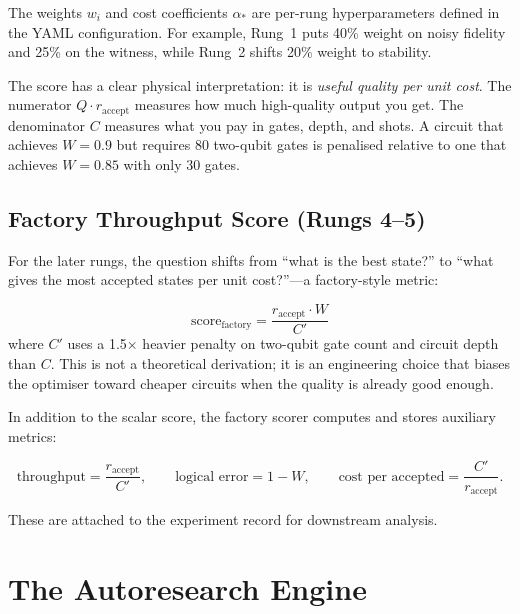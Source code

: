 \documentclass[11pt,a4paper]{article}
\begin{document}
The weights $w_i$ and cost coefficients $\alpha_*$ are per-rung
hyperparameters defined in the YAML configuration. For example, Rung~1 puts
40\% weight on noisy fidelity and 25\% on the witness, while Rung~2 shifts
20\% weight to stability.

\begin{intuition}
The score has a clear physical interpretation: it is \emph{useful quality per
unit cost}. The numerator $Q \cdot r_{\text{accept}}$ measures how much
high-quality output you get. The denominator $C$ measures what you pay in
gates, depth, and shots. A circuit that achieves $W = 0.9$ but requires 80
two-qubit gates is penalised relative to one that achieves $W = 0.85$ with
only 30 gates.
\end{intuition}

\subsection{Factory Throughput Score (Rungs 4--5)}
\label{sec:factory}

For the later rungs, the question shifts from ``what is the best state?'' to
``what gives the most accepted states per unit cost?''---a factory-style
metric:

\begin{equation}
  \text{score}_{\text{factory}}
    = \frac{r_{\text{accept}} \cdot W}{\;C'\;}
  \label{eq:factory}
\end{equation}
where $C'$ uses a 1.5$\times$ heavier penalty on two-qubit gate count and
circuit depth than $C$. This is not a theoretical derivation; it is an
engineering choice that biases the optimiser toward cheaper circuits when the
quality is already good enough.

In addition to the scalar score, the factory scorer computes and stores
auxiliary metrics:

\begin{equation}
  \text{throughput} = \frac{r_{\text{accept}}}{C'}, \qquad
  \text{logical error} = 1 - W, \qquad
  \text{cost per accepted} = \frac{C'}{r_{\text{accept}}}.
  \label{eq:factory_metrics}
\end{equation}

These are attached to the experiment record for downstream analysis.

\section{The Autoresearch Engine}
\label{sec:engine}
\end{document}
